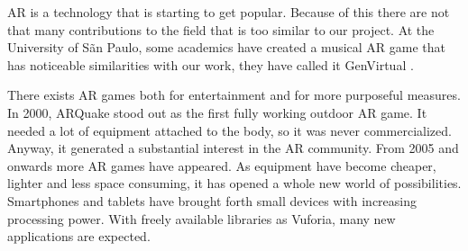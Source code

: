 \gls{AR} is a technology that is starting to get popular. Because of this there
are not that many contributions to the field that is too similar to our project.
At the University of S\~{a}n Paulo, some academics have created a musical AR game
that has noticeable similarities with our work, they have called it GenVirtual
\cite{GenVirtual}. 

There exists AR games both for entertainment and for more purposeful
measures\cite{tan2010augmented}. In 2000, ARQuake stood out as the first fully
working outdoor AR game. It needed a lot of equipment attached to the body, so
it was never commercialized. Anyway, it generated a substantial interest in the
AR community. From 2005 and onwards more AR games have appeared. As
equipment have become cheaper, lighter and less space consuming, it has opened a whole new world of possibilities. 
Smartphones and tablets have brought forth
small devices with increasing processing power. With freely available libraries
as \gls{Vuforia}, many new applications are expected.
